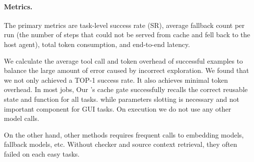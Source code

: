\paragraph{Metrics.}
The primary metrics are task-level success rate (SR), average fallback count per run (the number of steps that could not be served from cache and fell back to the host agent), total token consumption, and end-to-end latency.


\begin{table}[t]
  \centering
  \caption{AndroidWorld E2E report
  }
  \label{tab:e2e-workflow}
\end{table}



We calculate the average tool call and token overhead of successful examples to balance the large amount of error caused by incorrect exploration. We found that we not only achieved a TOP-1 success rate. It also achieves minimal token overhead. In most jobs, Our \sysname's cache gate successfully recalls the correct reusable state and function for all tasks. while parameters slotting is necessary and not important component for GUI tasks. On execution we do not use any other model calls.


On the other hand, other methods requires frequent calls to embedding models, fallback models, etc. Without checker and source context retrieval, they often failed on each easy tasks.



